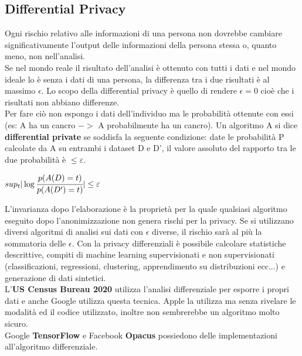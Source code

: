 \subsection{Differential Privacy}
Ogni rischio relativo alle informazioni di una persona non dovrebbe cambiare significativamente l'output delle informazioni della persona stessa o, quanto meno, non nell'analisi.\\
Se nel mondo reale il risultato dell'analisi è ottenuto con tutti i dati e nel mondo ideale lo è senza i dati di una persona, la differenza tra i due risultati è al massimo $\epsilon$.
Lo scopo della differential privacy è quello di rendere $\epsilon = 0$ cioè che i risultati non abbiano differenze.\\
Per fare ciò non espongo i dati dell'individuo ma le probabilità ottenute con essi (es: A ha un cancro $->$ A probabilmente ha un cancro).
Un algoritmo A si dice \textbf{differential private} se soddisfa la seguente condizione: date le probabilità P calcolate da A su entrambi i dataset D e D', il valore assoluto del rapporto tra le due probabilità è $\leq \varepsilon$.
\begin{center}
$sup_t | \log \cfrac{p(A(D) = t)}{p(A(D') = t)} | \leq \varepsilon$
\end{center}
L'invarianza dopo l'elaborazione è la proprietà per la quale qualsiasi algoritmo eseguito dopo l'anonimizzazione non genera rischi per la privacy.
Se si utilizzano diversi algoritmi di analisi sui dati con $\epsilon$ diverse, il rischio sarà al più la sommatoria delle $\epsilon$.
Con la privacy differenziali è possibile calcolare statistiche descrittive, compiti di machine learning supervisionati e non supervisionati (classificazioni, regressioni, clustering, apprendimento su distribuzioni ecc...) e generazione di dati sintetici.\\
L'\textbf{US Census Bureau 2020} utilizza l'analisi differenziale per esporre i propri dati e anche Google utilizza questa tecnica.
Apple la utilizza ma senza rivelare le modalità ed il codice utilizzato, inoltre non sembrerebbe un algoritmo molto sicuro.\\
Google \textbf{TensorFlow} e Facebook \textbf{Opacus} possiedono delle implementazioni all'algoritmo differenziale.
